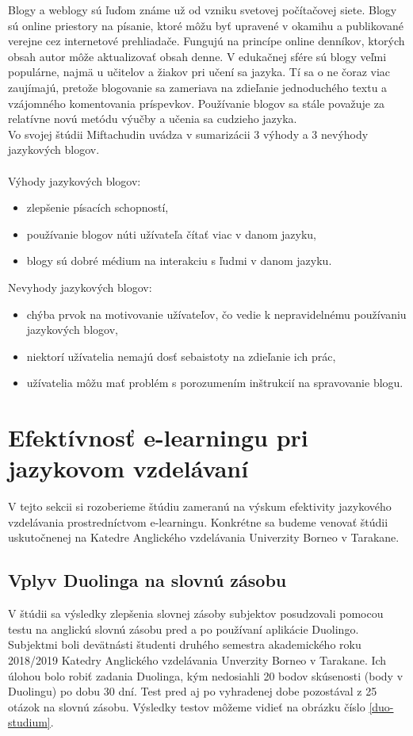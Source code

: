 \documentclass[10pt,oneside,slovak,a4paper]{article}
\begin{document}
Blogy a weblogy sú ľuďom známe už od vzniku svetovej počítačovej siete. Blogy sú online priestory na písanie, ktoré môžu byť upravené v okamihu a publikované verejne cez internetové prehliadače. Fungujú na princípe online denníkov, ktorých obsah autor môže aktualizovať obsah denne. V edukačnej sfére sú blogy veľmi  populárne, najmä u učitelov a žiakov pri učení sa jazyka. Tí sa o ne čoraz viac zaujímajú, pretože blogovanie sa zameriava na zdieľanie jednoduchého textu a vzájomného komentovania príspevkov. Používanie blogov sa stále považuje za relatívne novú metódu výučby a učenia sa cudzieho jazyka. \cite{blog-mif}\\
Vo svojej štúdii Miftachudin \cite{blog-mif} uvádza v sumarizácii 3 výhody a 3 nevýhody jazykových blogov.\\
\\
Výhody jazykových blogov:
\begin{itemize}
\item zlepšenie písacích schopností,
\item používanie blogov núti užívateľa čítať viac v danom jazyku,
\item blogy sú dobré médium na interakciu s ľudmi v danom jazyku. \cite{blog-mif}
\end{itemize}
Nevyhody jazykových blogov:
\begin{itemize}
\item chýba prvok na motivovanie užívateľov, čo vedie k nepravidelnému používaniu jazykových blogov,
\item niektorí užívatelia nemajú dosť sebaistoty na zdieľanie ich prác,
\item užívatelia môžu mať problém s porozumením inštrukcií na spravovanie blogu. \cite{blog-mif}
\end{itemize}



\section{Efektívnosť e-learningu pri jazykovom vzdelávaní}
V tejto sekcii si rozoberieme štúdiu zameranú na výskum efektivity jazykového vzdelávania prostredníctvom e-learningu. Konkrétne sa budeme venovať štúdii uskutočnenej na Katedre Anglického vzdelávania Univerzity Borneo v Tarakane.

\subsection{Vplyv Duolinga na slovnú zásobu}
V štúdii sa výsledky zlepšenia slovnej zásoby subjektov posudzovali pomocou testu na anglickú slovnú zásobu pred a po používaní aplikácie Duolingo. Subjektmi boli devätnásti študenti druhého semestra akademického roku 2018/2019 Katedry Anglického vzdelávania Unverzity Borneo v Tarakane. Ich úlohou bolo robiť zadania Duolinga, kým nedosiahli 20 bodov skúsenosti (body v Duolingu) po dobu 30 dní. Test pred aj po vyhradenej dobe pozostával z 25 otázok na slovnú zásobu. Výsledky testov môžeme vidieť na obrázku číslo \ref{duo-studium}. \cite{duolingo}
\end{document}
